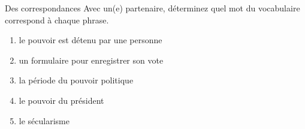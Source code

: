 \begin{frame}{Des correspondances}
  Avec un(e) partenaire, déterminez quel mot du vocabulaire correspond à chaque phrase.
  \begin{enumerate}
    \item {} le pouvoir est détenu par une personne
    \item {} un formulaire pour enregistrer son vote
    \item {} la période du pouvoir politique
    \item {} le pouvoir du président
    \item {} le sécularisme
  \end{enumerate}
\end{frame}
